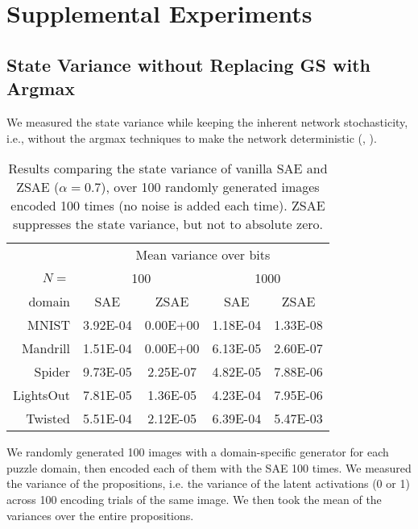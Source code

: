 \documentclass[10pt,letterpaper]{article}
\begin{document}
\section{Supplemental Experiments}


\subsection{State Variance without Replacing GS with Argmax}

We measured the state variance while keeping the inherent network stochasticity,
i.e., without the argmax techniques to
make the network deterministic (, ).

\begin{table}[htbp]
 \centering
 \setlength{\tabcolsep}{0.45em}
 \begin{tabular}{|r|*{4}{c|}}
       & \multicolumn{4}{c|}{Mean variance over bits} \\
$N=$ %
     & \multicolumn{2}{c|}{100}
     & \multicolumn{2}{c|}{1000} \\
domain   &SAE      &ZSAE     &SAE      &ZSAE     \\ 
MNIST    &3.92E-04 &0.00E+00 &1.18E-04 &1.33E-08 \\ 
Mandrill &1.51E-04 &0.00E+00 &6.13E-05 &2.60E-07 \\ 
Spider   &9.73E-05 &2.25E-07 &4.82E-05 &7.88E-06 \\ 
LightsOut&7.81E-05 &1.36E-05 &4.23E-04 &7.95E-06 \\ 
Twisted  &5.51E-04 &2.12E-05 &6.39E-04 &5.47E-03 \\ 
\end{tabular}
 \caption{Results comparing the state variance of vanilla SAE and ZSAE ($\alpha=0.7$),
 over 100 randomly generated images encoded 100 times (no noise is added each time).
 ZSAE suppresses the state variance, but not to absolute zero.
 }
\label{tab:variance-stochastic}
\end{table}

We randomly generated 100 images with a domain-specific generator for each puzzle domain,
then encoded each of them with the SAE 100 times.
We measured the variance of the propositions, i.e. the variance of the latent activations (0 or 1)
across 100 encoding trials of the same image.
We then took the mean of the variances over the entire propositions.
\end{document}
